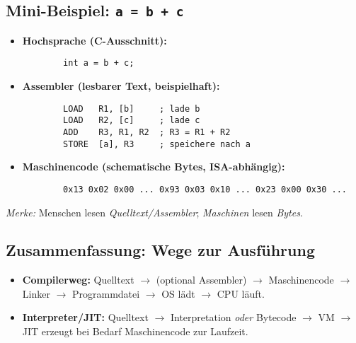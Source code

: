 \documentclass[../skript/main.tex]{subfiles}
\begin{document}
\subsection{Mini-Beispiel: \texttt{a = b + c}}
\begin{itemize}
	\item \textbf{Hochsprache (C-Ausschnitt):}
	\begin{verbatim}
		int a = b + c;
	\end{verbatim}
	\item \textbf{Assembler (lesbarer Text, beispielhaft):}
	\begin{verbatim}
		LOAD   R1, [b]     ; lade b
		LOAD   R2, [c]     ; lade c
		ADD    R3, R1, R2  ; R3 = R1 + R2
		STORE  [a], R3     ; speichere nach a
	\end{verbatim}
	\item \textbf{Maschinencode (schematische Bytes, ISA-abhängig):}
	\begin{verbatim}
		0x13 0x02 0x00 ... 0x93 0x03 0x10 ... 0x23 0x00 0x30 ...
	\end{verbatim}
\end{itemize}
\emph{Merke:} Menschen lesen \emph{Quelltext/Assembler}; \emph{Maschinen} lesen \emph{Bytes}.

\subsection{Zusammenfassung: Wege zur Ausführung}
\begin{itemize}
	\item \textbf{Compilerweg:} Quelltext \(\rightarrow\) (optional Assembler) \(\rightarrow\) Maschinencode \(\rightarrow\) Linker \(\rightarrow\) Programmdatei \(\rightarrow\) OS lädt \(\rightarrow\) CPU läuft.
	\item \textbf{Interpreter/JIT:} Quelltext \(\rightarrow\) Interpretation \emph{oder} Bytecode \(\rightarrow\) VM \(\rightarrow\) JIT erzeugt bei Bedarf Maschinencode zur Laufzeit.
\end{itemize}

\end{document}
